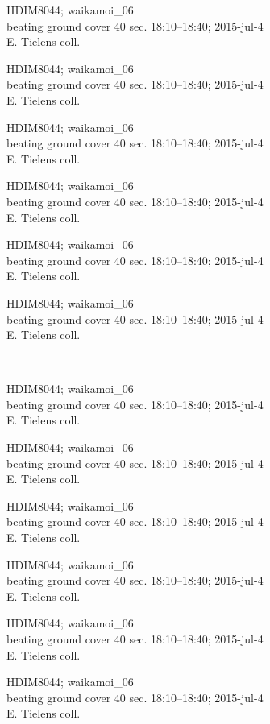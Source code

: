 \documentclass[2pt]{extarticle}
\begin{document}
\noindent
\parbox{0.16\textwidth}{\tiny \raggedright \rule[-0.3\baselineskip]{0pt}{10pt}HDIM8044; waikamoi\_06\\ beating ground cover 40 sec. 18:10--18:40; 2015-jul-4\\ E. Tielens coll.}
\parbox{0.16\textwidth}{\tiny \raggedright \rule[-0.3\baselineskip]{0pt}{10pt}HDIM8044; waikamoi\_06\\ beating ground cover 40 sec. 18:10--18:40; 2015-jul-4\\ E. Tielens coll.}
\parbox{0.16\textwidth}{\tiny \raggedright \rule[-0.3\baselineskip]{0pt}{10pt}HDIM8044; waikamoi\_06\\ beating ground cover 40 sec. 18:10--18:40; 2015-jul-4\\ E. Tielens coll.}
\parbox{0.16\textwidth}{\tiny \raggedright \rule[-0.3\baselineskip]{0pt}{10pt}HDIM8044; waikamoi\_06\\ beating ground cover 40 sec. 18:10--18:40; 2015-jul-4\\ E. Tielens coll.}
\parbox{0.16\textwidth}{\tiny \raggedright \rule[-0.3\baselineskip]{0pt}{10pt}HDIM8044; waikamoi\_06\\ beating ground cover 40 sec. 18:10--18:40; 2015-jul-4\\ E. Tielens coll.}
\parbox{0.16\textwidth}{\tiny \raggedright \rule[-0.3\baselineskip]{0pt}{10pt}HDIM8044; waikamoi\_06\\ beating ground cover 40 sec. 18:10--18:40; 2015-jul-4\\ E. Tielens coll.} \\ 
\vspace{0.001in} 

\noindent
\parbox{0.16\textwidth}{\tiny \raggedright \rule[-0.3\baselineskip]{0pt}{10pt}HDIM8044; waikamoi\_06\\ beating ground cover 40 sec. 18:10--18:40; 2015-jul-4\\ E. Tielens coll.}
\parbox{0.16\textwidth}{\tiny \raggedright \rule[-0.3\baselineskip]{0pt}{10pt}HDIM8044; waikamoi\_06\\ beating ground cover 40 sec. 18:10--18:40; 2015-jul-4\\ E. Tielens coll.}
\parbox{0.16\textwidth}{\tiny \raggedright \rule[-0.3\baselineskip]{0pt}{10pt}HDIM8044; waikamoi\_06\\ beating ground cover 40 sec. 18:10--18:40; 2015-jul-4\\ E. Tielens coll.}
\parbox{0.16\textwidth}{\tiny \raggedright \rule[-0.3\baselineskip]{0pt}{10pt}HDIM8044; waikamoi\_06\\ beating ground cover 40 sec. 18:10--18:40; 2015-jul-4\\ E. Tielens coll.}
\parbox{0.16\textwidth}{\tiny \raggedright \rule[-0.3\baselineskip]{0pt}{10pt}HDIM8044; waikamoi\_06\\ beating ground cover 40 sec. 18:10--18:40; 2015-jul-4\\ E. Tielens coll.}
\parbox{0.16\textwidth}{\tiny \raggedright \rule[-0.3\baselineskip]{0pt}{10pt}HDIM8044; waikamoi\_06\\ beating ground cover 40 sec. 18:10--18:40; 2015-jul-4\\ E. Tielens coll.} \\ 
\vspace{0.001in} 
\end{document}
